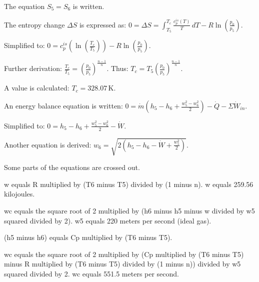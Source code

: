 The equation \( S_5 = S_6 \) is written.  

The entropy change \( \Delta S \) is expressed as:  
\( 0 = \Delta S = \int_{T_5}^{T_c} \frac{c_p^{is}(T)}{T} \, dT - R \ln \left( \frac{p_0}{p_5} \right) \).  

Simplified to:  
\( 0 = c_p^{is} \left( \ln \left( \frac{T_c}{T_5} \right) \right) - R \ln \left( \frac{p_0}{p_5} \right) \).  

Further derivation:  
\( \frac{T_c}{T_5} = \left( \frac{p_0}{p_5} \right)^{\frac{n-1}{n}} \).  
Thus:  
\( T_c = T_5 \left( \frac{p_0}{p_5} \right)^{\frac{n-1}{n}} \).  

A value is calculated:  
\( T_c = 328.07 \, \text{K} \).  

An energy balance equation is written:  
\( 0 = \dot{m} \left( h_5 - h_6 + \frac{w_5^2 - w_6^2}{2} \right) - \dot{Q} - \Sigma \dot{W}_{in} \).  

Simplified to:  
\( 0 = h_5 - h_6 + \frac{w_5^2 - w_6^2}{2} - \dot{W} \).  

Another equation is derived:  
\( w_6 = \sqrt{2 \left( h_5 - h_6 - \dot{W} + \frac{w_5^2}{2} \right)} \).  

Some parts of the equations are crossed out.

w equals R multiplied by (T6 minus T5) divided by (1 minus n).  
w equals 259.56 kilojoules.  

wc equals the square root of 2 multiplied by (h6 minus h5 minus w divided by w5 squared divided by 2).  
w5 equals 220 meters per second (ideal gas).  

(h5 minus h6) equals Cp multiplied by (T6 minus T5).  

wc equals the square root of 2 multiplied by (Cp multiplied by (T6 minus T5) minus R multiplied by (T6 minus T5) divided by (1 minus n)) divided by w5 squared divided by 2.  
wc equals 551.5 meters per second.
